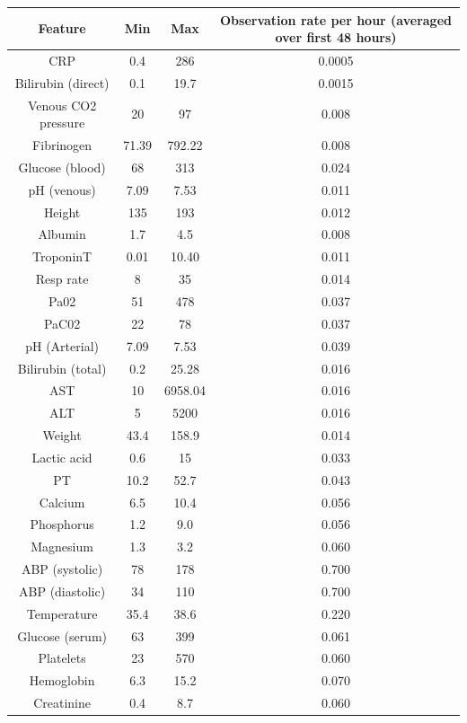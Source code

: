 \begin{table}[!ht]
    \centering
    \begin{tabular}{|c|c|c|c|} \hline 
         Feature&  Min&  Max& Observation rate per hour  (averaged over first 48 hours)\\ \hline 
         CRP&  0.4&  286& 0.0005\\ \hline 
         Bilirubin (direct)&  0.1&  19.7& 0.0015\\ \hline 
         Venous CO2 pressure&  20&  97& 0.008\\ \hline 
         Fibrinogen&  71.39&  792.22& 0.008\\ \hline 
         Glucose (blood)&  68&  313& 0.024\\ \hline 
         pH (venous)&  7.09&  7.53& 0.011\\ \hline 
         Height&  135&  193& 0.012\\ \hline 
         Albumin&  1.7&  4.5& 0.008\\ \hline 
         TroponinT&  0.01&  10.40& 0.011\\ \hline 
 Resp rate& 8& 35&0.014\\ \hline 
 Pa02& 51& 478&0.037\\ \hline 
 PaC02& 22& 78&0.037\\ \hline 
 pH (Arterial)& 7.09& 7.53&0.039\\ \hline 
 Bilirubin (total)& 0.2& 25.28&0.016\\ \hline 
 AST& 10& 6958.04&0.016\\ \hline 
 ALT& 5& 5200&0.016\\ \hline 
 Weight& 43.4& 158.9&0.014\\ \hline 
 Lactic acid& 0.6& 15&0.033\\ \hline 
 PT& 10.2& 52.7&0.043\\ \hline 
 Calcium& 6.5& 10.4&0.056\\ \hline 
 Phosphorus& 1.2& 9.0&0.056\\ \hline 
 Magnesium& 1.3& 3.2&0.060\\ \hline 
 ABP (systolic)& 78& 178&0.700\\ \hline 
 ABP (diastolic)& 34& 110&0.700\\ \hline 
 Temperature& 35.4& 38.6&0.220\\ \hline 
 Glucose (serum)& 63& 399&0.061\\ \hline 
 Platelets& 23& 570&0.060\\ \hline 
 Hemoglobin& 6.3& 15.2&0.070\\ \hline 
 Creatinine& 0.4& 8.7&0.060\\ \hline 

\end{tabular}
\end{table}
